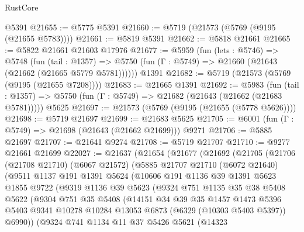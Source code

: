 \begin{lexlean}{RustCore}
\begin{coremodule}
    @5391
@21655 := @5775 @5391
@21660 := @5719 (@21573 (@5769 (@9195 (@21655 @5783))))
@21661 := @5819 @5391
@21662 := @5818 @21661
@21665 := @5822 @21661 @21603 @17976
@21677 := @5959
    (fun (lets : @5746) =>
    @5748
      (fun (tail : @1357) =>
      @5750 (fun (Γ : @5749) => @21660 (@21643 (@21662 (@21665 @5779 @5781))))))
    @1391
@21682 := @5719 (@21573 (@5769 (@9195 (@21655 @7208))))
@21683 := @21665 @1391
@21692 := @5983
    (fun (tail : @1357) => @5750 (fun (Γ : @5749) => @21682 (@21643 (@21662 (@21683 @5781)))))
    @5625
@21697 := @21573 (@5769 (@9195 (@21655 (@5778 @5626))))
@21698 := @5719 @21697
@21699 := @21683 @5625
@21705 := @6001 (fun (Γ : @5749) => @21698 (@21643 (@21662 @21699))) @9271
@21706 := @5885 @21697
@21707 := @21641 @9274
@21708 := @5719 @21707
@21710 := @9277 @21661 @21699
@22027 := @21637
    (@21654
      (@21677
        (@21692
          (@21705
            (@21706
              (@21708 @21710)
              (@6067 @21572)
              (@5885
                @21707
                @21710
                (@6072 @21640)
                (@9511
                  @1137
                  @191
                  @1391
                  @5624
                  (@10606
                    @191
                    @1136
                    @39
                    @1391
                    @5623
                    @1855
                    @9722
                    (@9319
                      @1136
                      @39
                      @5623
                      (@9324
                        @751
                        @1135
                        @35
                        @38
                        @5408
                        @5622
                        (@9304
                          @751
                          @35
                          @5408
                          (@14151
                            @34
                            @39
                            @35
                            @1457
                            @1473
                            @5396
                            @5403
                            @9341
                            @10278
                            @10284
                            @13053
                            @6873
                            (@6329 (@10303 @5403 @5397))
                            @6990))
                        (@9324
                          @741
                          @1134
                          @11
                          @37
                          @5426
                          @5621
                          (@14323

\end{coremodule}
\end{lexlean}
